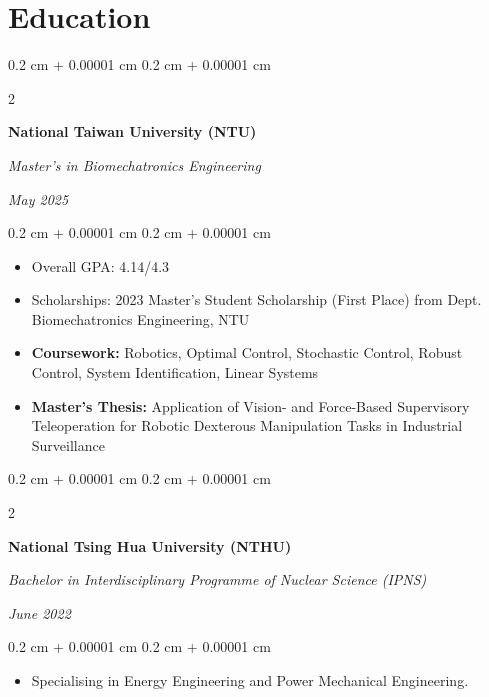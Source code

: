 \documentclass[10pt, letterpaper]{article}
\newenvironment{highlights}{
    \begin{itemize}[
        topsep=0.10 cm,
        parsep=0.10 cm,
        partopsep=0pt,
        itemsep=0pt,
        leftmargin=0.4 cm + 10pt
    ]
}{
    \end{itemize}
} %
\newenvironment{onecolentry}{
    \begin{adjustwidth}{
        0.2 cm + 0.00001 cm
    }{
        0.2 cm + 0.00001 cm
    }
}{
    \end{adjustwidth}
} %
\newenvironment{twocolentry}[2][]{
    \onecolentry
    \def\secondColumn{#2}
    \setcolumnwidth{\fill, 4.5 cm}
    \begin{paracol}{2}
}{
    \switchcolumn \raggedleft \secondColumn
    \end{paracol}
    \endonecolentry
} %
\begin{document}
    \section{Education}
        
        \begin{twocolentry}{
            
            
        \textit{May 2025}}
            \textbf{National Taiwan University (NTU)}

            \textit{Master's in Biomechatronics Engineering}
        \end{twocolentry}

        \vspace{0.10 cm}
        \begin{onecolentry}
            \begin{highlights}
                \item Overall GPA: 4.14/4.3
                \item Scholarships: 2023 Master's Student Scholarship (First Place) from Dept. Biomechatronics Engineering, NTU
                \item \textbf{Coursework:} Robotics, Optimal Control, Stochastic Control, Robust Control, System Identification, Linear Systems
                \item \textbf{Master's Thesis:} Application of Vision- and Force-Based Supervisory Teleoperation for Robotic Dexterous Manipulation Tasks in Industrial Surveillance
            \end{highlights}
        \end{onecolentry}

        \vspace{0.2 cm}

        \begin{twocolentry}{
            
        \textit{June 2022}}
            \textbf{National Tsing Hua University (NTHU)}
            
            \textit{Bachelor in Interdisciplinary Programme of Nuclear Science (IPNS)}
        \end{twocolentry}
        \vspace{0.10 cm}
        \begin{onecolentry}
            \begin{highlights}
                \item Specialising in Energy Engineering and Power Mechanical Engineering.
            \end{highlights}
        \end{onecolentry}
\end{document}
